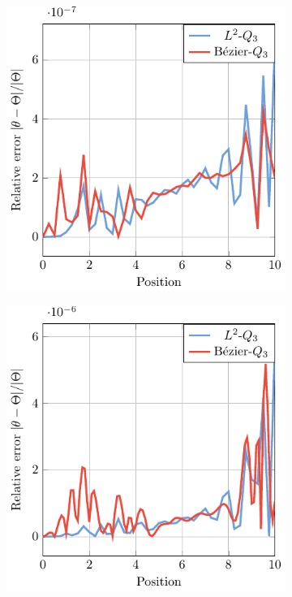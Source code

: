 \documentclass[preprint,12pt]{elsarticle}
\theoremstyle{remark}
\begin{document}
\begin{figure}[!hbt]
    \centering
    \captionsetup[subfigure]{font = footnotesize}
    \begin{subfigure}[b]{.49\textwidth}
        \centering
        \includegraphics[width = \textwidth]{L-beam-angle-error}
        \caption{}\label{fig:L-beam-angle-error}
    \end{subfigure}
    \begin{subfigure}[b]{.49\textwidth}
        \centering
        \includegraphics[width = \textwidth]{L-beam-angle-error1}

\end{subfigure}
\end{figure}
\end{document}
